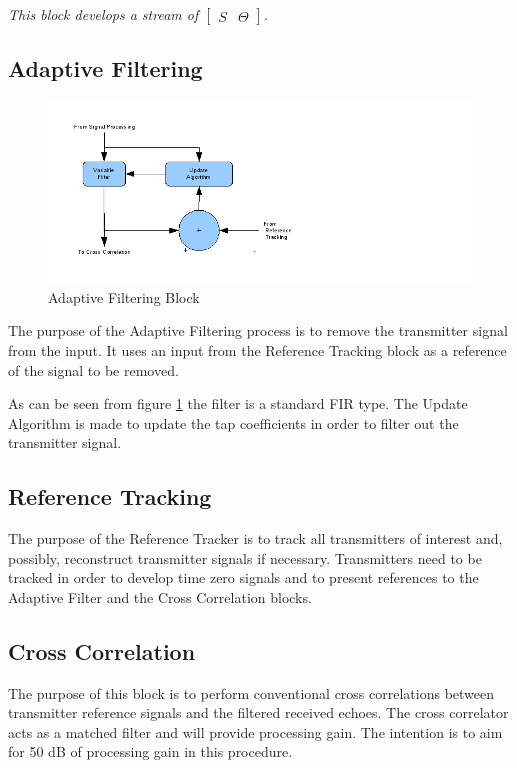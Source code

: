 \documentclass[a4paper]{report}
\newcommand\textstyleEmphasis[1]{\textit{#1}}
\numberwithin{equation}{chapter}
\begin{document}
\textstyleEmphasis{\textup{This block develops a stream of $ \begin{bmatrix} S & \Theta \end{bmatrix} $.}}

\subsection[Adaptive Filtering]{Adaptive Filtering}

\begin{figure}
\centering 
\includegraphics{Passive-Weather-Radar-Theory-fig-06.png}
\caption[Adaptive Filtering Block]{Adaptive Filtering Block}
\label{fig:06}
\end{figure}

The purpose of the Adaptive Filtering process is to remove the transmitter signal from the input. It uses an input from the Reference Tracking block as a reference of the signal to be removed.

\bigskip

As can be seen from figure \ref{fig:06} the filter is a standard FIR type. The Update Algorithm is made to update the tap coefficients in order to filter out the transmitter signal.

\subsection[Reference Tracking]{Reference Tracking}
The purpose of the Reference Tracker is to track all transmitters of interest and, possibly, reconstruct transmitter signals if necessary. Transmitters need to be tracked in order to develop time zero signals and to present references to the Adaptive Filter and the Cross Correlation blocks.

\subsection[Cross Correlation]{Cross Correlation}
The purpose of this block is to perform conventional cross correlations between transmitter reference signals and the filtered received echoes. The cross correlator acts as a matched filter and will provide processing gain. The intention is to aim for 50 dB of processing gain in this procedure.
\end{document}
